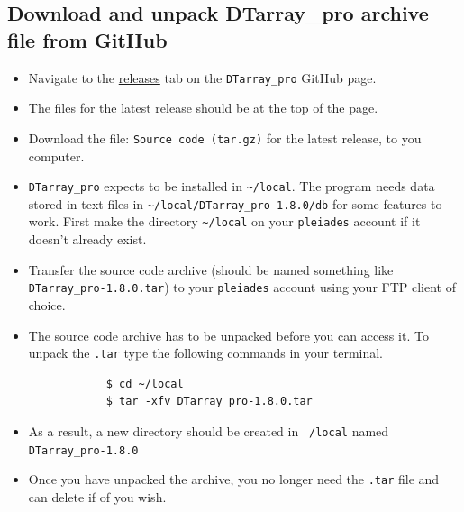\documentclass[12pt]{article}
\newcommand{\VERSION}{1.8.0}
\begin{document}
	\subsection{Download and unpack DTarray\_pro archive file from GitHub}
	\begin{itemize}
		\item Navigate to the \href{https://github.com/ajmaurais/DTarray_pro/releases}{releases} tab on the \texttt{DTarray\_pro} GitHub page.
		
		\item The files for the latest release should be at the top of the page.
		
		\item Download the file: \texttt{Source code (tar.gz)} for the latest release, to you computer.
		
		\item \texttt{DTarray\_pro} expects to be installed in \texttt{\textasciitilde/local}. The program needs data stored in text files in \texttt{\textasciitilde/local/DTarray\_pro-\VERSION/db} for some features to work. First make the directory \texttt{\textasciitilde/local} on your \texttt{pleiades} account if it doesn't already exist.
		
		\item Transfer the source code archive (should be named something like \texttt{DTarray\_pro-\VERSION.tar}) to your \texttt{pleiades} account using your FTP client of choice.	
		
		\item The source code archive has to be unpacked before you can access it. To unpack the \texttt{.tar} type the following commands in your terminal.
		
		\begin{lstlisting}
			$ cd ~/local
			$ tar -xfv DTarray_pro-1.8.0.tar
		\end{lstlisting}
		
		\item As a result, a new directory should be created in \texttt{~/local} named \texttt{DTarray\_pro-\VERSION}
		
		\item Once you have unpacked the archive, you no longer need the \texttt{.tar} file and can delete if of you wish.
		
	\end{itemize}
\end{document}
